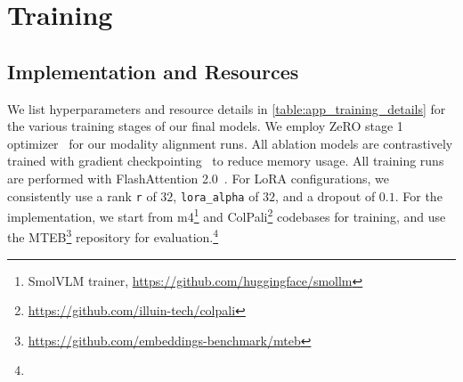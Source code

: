 \section{Training}

\subsection{Implementation and Resources}
\label{appendix:implementation_details}

We list hyperparameters and resource details in \autoref{table:app_training_details} for the various training stages of our final models. We employ ZeRO stage 1 optimizer~\citep{rajbhandari2020zeromemoryoptimizationstraining} for our modality alignment runs. All ablation models are contrastively trained with gradient checkpointing~\citep{chen2016trainingdeepnetssublinear} to reduce memory usage. All training runs are performed with FlashAttention 2.0~\citep{dao2023flashattention2fasterattentionbetter}. For LoRA configurations, we consistently use a rank \texttt{r} of $32$, \texttt{lora\_alpha} of $32$, and a dropout of $0.1$. For the implementation, we start from m4\footnote{SmolVLM trainer, \url{https://github.com/huggingface/smollm}} and ColPali\footnote{\url{https://github.com/illuin-tech/colpali}} codebases for training, and use the MTEB\footnote{\url{https://github.com/embeddings-benchmark/mteb}} repository for evaluation.\footnote{\ghrepo}

